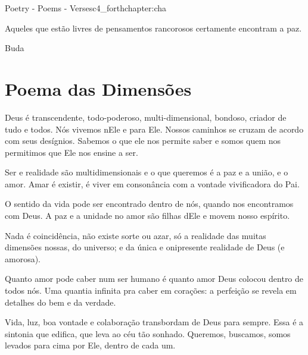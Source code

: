 

\begin{chapterpage}{Poetry - Poems - Verses}{c4_forthchapter:cha}

\begin{myquotation}Aqueles que estão livres de pensamentos rancorosos certamente encontram a paz.\par\vspace*{15mm}
\mbox{}\hfill \emdash{}Buda
\par\end{myquotation}

\end{chapterpage}


\section{Poema das Dimensões}\label{c1_images:sec}

Deus é transcendente, todo-poderoso, multi-dimensional, bondoso, criador de tudo e todos. Nós vivemos nEle e para Ele. Nossos caminhos se cruzam de acordo com seus desígnios. Sabemos o que ele nos permite saber e somos quem nos permitimos que Ele nos ensine a ser. 

Ser e realidade são multidimensionais e o que queremos é a paz e a união, e o amor. Amar é existir, é viver em consonância com a vontade vivificadora do Pai. 

O sentido da vida pode ser encontrado dentro de nós, quando nos encontramos com Deus. A paz e a unidade no amor são filhas dEle e movem nosso espírito.  

Nada é coincidência, não existe sorte ou azar, só a realidade das muitas dimensões nossas, do universo; e da única e onipresente realidade de Deus (e amorosa). 

Quanto amor pode caber num ser humano é quanto amor Deus colocou dentro de todos nós. Uma quantia infinita pra caber em corações: a perfeição se revela em detalhes do bem e da verdade. 

Vida, luz, boa vontade e colaboração transbordam de Deus para sempre. Essa é a sintonia que edifica, que leva ao céu tão sonhado. Queremos, buscamos, somos levados para cima por Ele, dentro de cada um. 

